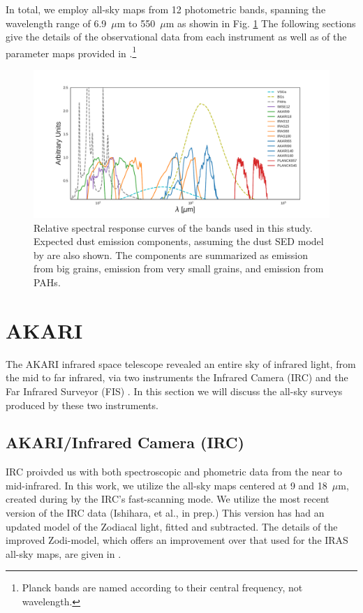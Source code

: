     In total, we employ all-sky maps from 12 photometric bands, spanning the wavelength range of 6.9~$\mu$m to 550~$\mu$m as showin in Fig. \ref{fig:Filter_coverage_example_full} The following sections give the details of the observational data from each instrument as well as of the parameter maps provided in \cite{planck15X}.\footnote{Planck bands are named according to their central frequency, not wavelength.}
    \begin{figure}
      \centering
      \includegraphics[width=\textwidth]{../Plots/ch_datasources/Filter_coverage_example_full.pdf}
      \caption{Relative spectral response curves of the bands used in this study. Expected dust emission components, assuming the dust SED model by \citep{dustem11} are also shown. The components are summarized as emission from big grains, emission from very small grains, and emission from PAHs.}
      \label{fig:Filter_coverage_example_full}
    \end{figure}

  \section{AKARI}

       The AKARI infrared space telescope revealed an entire sky of infrared light, from the mid to far infrared, via two instruments \citep{akari07} the Infrared Camera (IRC)\citep{irc07} and the Far Infrared Surveyor (FIS) \citep{fis07}. In this section we will discuss the all-sky surveys produced by these two instruments.

       \subsection{AKARI/Infrared Camera (IRC) }
           IRC proivded us with both spectroscopic and phometric data from the near to mid-infrared. In this work, we utilize the all-sky maps centered at 9 and 18~$\mu$m, created during by the IRC's fast-scanning mode. We utilize the most recent version of the IRC data (Ishihara, et al., in prep.) This version has had an updated model of the Zodiacal light, fitted and subtracted. The details of the improved Zodi-model, which offers an improvement over that used for the IRAS all-sky maps, are given in \cite{kondo16}.

